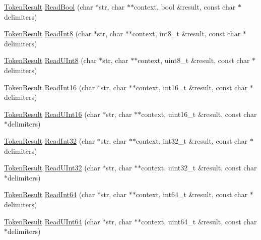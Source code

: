 \begin{DoxyCompactItemize}
\item 
\hyperlink{namespacemage_a2178ba2411db5912f41b2e7698c2037d}{Token\+Result} \hyperlink{namespacemage_af0a37dab7ba4c58335ff1e84d7279c1c}{Read\+Bool} (char $\ast$str, char $\ast$$\ast$context, bool \&result, const char $\ast$delimiters)
\item 
\hyperlink{namespacemage_a2178ba2411db5912f41b2e7698c2037d}{Token\+Result} \hyperlink{namespacemage_a53968b4c1082fa6042a1278a1fb628d1}{Read\+Int8} (char $\ast$str, char $\ast$$\ast$context, int8\+\_\+t \&result, const char $\ast$delimiters)
\item 
\hyperlink{namespacemage_a2178ba2411db5912f41b2e7698c2037d}{Token\+Result} \hyperlink{namespacemage_a357352c06cab6568efee62ddc9dcc6c9}{Read\+U\+Int8} (char $\ast$str, char $\ast$$\ast$context, uint8\+\_\+t \&result, const char $\ast$delimiters)
\item 
\hyperlink{namespacemage_a2178ba2411db5912f41b2e7698c2037d}{Token\+Result} \hyperlink{namespacemage_ae5362fb3f4d97bcecd70e5baeb22834f}{Read\+Int16} (char $\ast$str, char $\ast$$\ast$context, int16\+\_\+t \&result, const char $\ast$delimiters)
\item 
\hyperlink{namespacemage_a2178ba2411db5912f41b2e7698c2037d}{Token\+Result} \hyperlink{namespacemage_a8e94422a0e962b98b2555bc95c6eff4c}{Read\+U\+Int16} (char $\ast$str, char $\ast$$\ast$context, uint16\+\_\+t \&result, const char $\ast$delimiters)
\item 
\hyperlink{namespacemage_a2178ba2411db5912f41b2e7698c2037d}{Token\+Result} \hyperlink{namespacemage_a159df5ff8941b52ea523d0ebb4c2fd24}{Read\+Int32} (char $\ast$str, char $\ast$$\ast$context, int32\+\_\+t \&result, const char $\ast$delimiters)
\item 
\hyperlink{namespacemage_a2178ba2411db5912f41b2e7698c2037d}{Token\+Result} \hyperlink{namespacemage_aaa46d4e55d14328f2c97ffbcd9167727}{Read\+U\+Int32} (char $\ast$str, char $\ast$$\ast$context, uint32\+\_\+t \&result, const char $\ast$delimiters)
\item 
\hyperlink{namespacemage_a2178ba2411db5912f41b2e7698c2037d}{Token\+Result} \hyperlink{namespacemage_aba0fbc26edf53c3ad92f954adca8e86d}{Read\+Int64} (char $\ast$str, char $\ast$$\ast$context, int64\+\_\+t \&result, const char $\ast$delimiters)
\item 
\hyperlink{namespacemage_a2178ba2411db5912f41b2e7698c2037d}{Token\+Result} \hyperlink{namespacemage_a87be513083fe421ab93f3007538ebef6}{Read\+U\+Int64} (char $\ast$str, char $\ast$$\ast$context, uint64\+\_\+t \&result, const char $\ast$delimiters)
$$
\end{DoxyCompactItemize}
